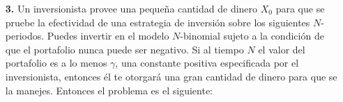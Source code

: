 \documentclass[letterpaper]{article}
\newcommand{\E}{\mathbb{E}}
\newcommand{\1}{\mathds{1}}
\theoremstyle{definition}
\theoremstyle{definition}
\theoremstyle{definition}
\theoremstyle{definition}
\theoremstyle{definition}
\begin{document}
\begin{enumerate}
\begin{proof}
        Luego, despejando $\lambda$, tenemos que 
        \[
        \lambda^{\frac{1}{p-1}}=\frac{X_0(1+r)^{\frac{Np}{p-1}}}{\E\left[Z^{\frac{1}{p-1}}\right]}.   
        \]
        Ya con el valor de $\lambda$, utilizamos la ecuación que nos entrega el valor de la riqueza en el instante $N$, a saber,
        \begin{align*}
            X_N=I \left(\frac{\lambda Z}{(1+r)^N}\right)&=\left(\frac{\lambda Z}{(1+r)^N}\right)^{\frac{1}{p-1}}\\
            &=\lambda^{\frac{1}{p-1}}\frac{Z^{\frac{1}{p-1}}}{(1+r)^{\frac{N}{p-1}}}\\
            &=\frac{X_0(1+r)^{\frac{Np}{p-1}}}{\E\left[Z^{\frac{1}{p-1}}\right]}\frac{Z^{\frac{1}{p-1}}}{(1+r)^{\frac{N}{p-1}}}\\
            &=\frac{X_0(1+r)^{\frac{Np}{p-1}-\frac{N}{p-1}}Z^{\frac{1}{p-1}}}{\E\left[Z^{\frac{1}{p-1}}\right]}\\
            &=\frac{X_0(1+r)^{N}Z^{\frac{1}{p-1}}}{\E\left[Z^{\frac{p}{p-1}}\right]},    
        \end{align*}
        tal y como se quería.

        \end{proof}
    \item[\textbf{3.}] Un inversionista provee una pequeña cantidad de dinero $X_0$ para que se pruebe la efectividad de 
    una estrategia de inversión sobre los siguientes $N$-periodos. Puedes invertir en el modelo $N$-binomial
    sujeto a la condición de que el portafolio nunca puede ser negativo. Si al tiempo $N$ el valor del portafolio
    es a lo menos $\gamma$, una constante positiva especificada por el inversionista, 
    entonces él te otorgará una gran cantidad de dinero para que se la manejes. Entonces el problema 
    es el siguiente: 


\end{enumerate}
\end{document}
